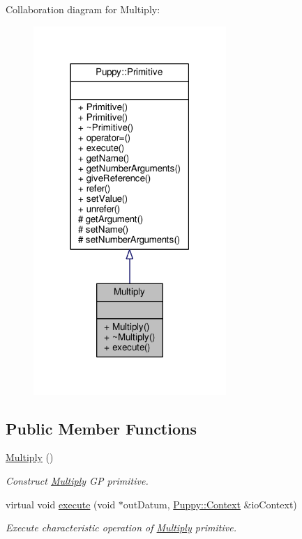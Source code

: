 Collaboration diagram for Multiply\+:
\nopagebreak
\begin{figure}[H]
\begin{center}
\leavevmode
\includegraphics[width=207pt]{classMultiply__coll__graph}
\end{center}
\end{figure}
\subsection*{Public Member Functions}
\begin{DoxyCompactItemize}
\item 
\hypertarget{classMultiply_ae7af092a55a333b67bd20ffa86d6cb9e}{}\hyperlink{classMultiply_ae7af092a55a333b67bd20ffa86d6cb9e}{Multiply} ()\label{classMultiply_ae7af092a55a333b67bd20ffa86d6cb9e}

\begin{DoxyCompactList}\small\item\em Construct \hyperlink{classMultiply}{Multiply} G\+P primitive. \end{DoxyCompactList}\item 
virtual void \hyperlink{classMultiply_a965412103b5dadd21ed4d58c8d6c6d87}{execute} (void $\ast$out\+Datum, \hyperlink{classPuppy_1_1Context}{Puppy\+::\+Context} \&io\+Context)
\begin{DoxyCompactList}\small\item\em Execute characteristic operation of \hyperlink{classMultiply}{Multiply} primitive. \end{DoxyCompactList}\end{DoxyCompactItemize}

